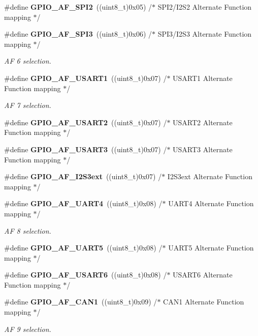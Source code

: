 \begin{DoxyCompactItemize}
\#define \textbf{ G\+P\+I\+O\+\_\+\+A\+F\+\_\+\+S\+P\+I2}~((uint8\+\_\+t)0x05)  /$\ast$ S\+P\+I2/\+I2\+S2 Alternate Function mapping $\ast$/
\item 
\#define \textbf{ G\+P\+I\+O\+\_\+\+A\+F\+\_\+\+S\+P\+I3}~((uint8\+\_\+t)0x06)  /$\ast$ S\+P\+I3/\+I2\+S3 Alternate Function mapping $\ast$/
\begin{DoxyCompactList}\small\item\em AF 6 selection. \end{DoxyCompactList}\item 
\#define \textbf{ G\+P\+I\+O\+\_\+\+A\+F\+\_\+\+U\+S\+A\+R\+T1}~((uint8\+\_\+t)0x07)  /$\ast$ U\+S\+A\+R\+T1 Alternate Function mapping $\ast$/
\begin{DoxyCompactList}\small\item\em AF 7 selection. \end{DoxyCompactList}\item 
\#define \textbf{ G\+P\+I\+O\+\_\+\+A\+F\+\_\+\+U\+S\+A\+R\+T2}~((uint8\+\_\+t)0x07)  /$\ast$ U\+S\+A\+R\+T2 Alternate Function mapping $\ast$/
\item 
\#define \textbf{ G\+P\+I\+O\+\_\+\+A\+F\+\_\+\+U\+S\+A\+R\+T3}~((uint8\+\_\+t)0x07)  /$\ast$ U\+S\+A\+R\+T3 Alternate Function mapping $\ast$/
\item 
\#define \textbf{ G\+P\+I\+O\+\_\+\+A\+F\+\_\+\+I2\+S3ext}~((uint8\+\_\+t)0x07)  /$\ast$ I2\+S3ext Alternate Function mapping $\ast$/
\item 
\#define \textbf{ G\+P\+I\+O\+\_\+\+A\+F\+\_\+\+U\+A\+R\+T4}~((uint8\+\_\+t)0x08)  /$\ast$ U\+A\+R\+T4 Alternate Function mapping $\ast$/
\begin{DoxyCompactList}\small\item\em AF 8 selection. \end{DoxyCompactList}\item 
\#define \textbf{ G\+P\+I\+O\+\_\+\+A\+F\+\_\+\+U\+A\+R\+T5}~((uint8\+\_\+t)0x08)  /$\ast$ U\+A\+R\+T5 Alternate Function mapping $\ast$/
\item 
\#define \textbf{ G\+P\+I\+O\+\_\+\+A\+F\+\_\+\+U\+S\+A\+R\+T6}~((uint8\+\_\+t)0x08)  /$\ast$ U\+S\+A\+R\+T6 Alternate Function mapping $\ast$/
\item 
\#define \textbf{ G\+P\+I\+O\+\_\+\+A\+F\+\_\+\+C\+A\+N1}~((uint8\+\_\+t)0x09)  /$\ast$ C\+A\+N1 Alternate Function mapping $\ast$/
\begin{DoxyCompactList}\small\item\em AF 9 selection. \end{DoxyCompactList}\item 

\end{DoxyCompactItemize}
